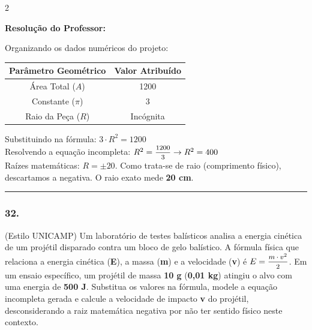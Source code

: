 \begin{multicols*}{2}
\ifgabarito
    \begin{tcolorbox}[colback=CorTitUm!5, colframe=CorTitUm, boxrule=1pt, arc=4pt, left=6pt, right=6pt, top=6pt, bottom=6pt]
    \small\textbf{\textcolor{CorTitUm}{Resolução do Professor:}}\par\vspace{0.1cm}
    \color{CinzaEscuro}
    Organizando os dados numéricos do projeto:
    \vspace{0.1cm}
    \begin{center}
    \begin{tabular}{|c|c|}
    \hline
    \textbf{Parâmetro Geométrico} & \textbf{Valor Atribuído} \\
    \hline
    Área Total ($A$) & 1200 \\
    \hline
    Constante ($\pi$) & 3 \\
    \hline
    Raio da Peça ($R$) & Incógnita \\
    \hline
    \end{tabular}
    \end{center}
    \vspace{0.1cm}
    Substituindo na fórmula: $3 \cdot R^2 = 1200$\\
    Resolvendo a equação incompleta: $R^2 = \mfrac{1200}{3} \rightarrow R^2 = 400$\\
    Raízes matemáticas: $R = \pm 20$. Como trata-se de raio (comprimento físico), descartamos a negativa. O raio exato mede \textbf{20 cm}.
    \end{tcolorbox}
\fi

\par\vspace{\espacoQuestao}

\noindent\textcolor{CorLinha}{\rule{\linewidth}{0.5pt}} 
\par\vspace{\espacoPreQuestao}
\subsubsection*{32.} (Estilo UNICAMP) Um laboratório de testes balísticos analisa a energia cinética de um projétil disparado contra um bloco de gelo balístico. A fórmula física que relaciona a energia cinética (\textbf{E}), a massa (\textbf{m}) e a velocidade (\textbf{v}) é $ E = \mfrac{m \cdot v^2}{2} $. Em um ensaio específico, um projétil de massa \textbf{10 g} (\textbf{0,01 kg}) atingiu o alvo com uma energia de \textbf{500 J}. Substitua os valores na fórmula, modele a equação incompleta gerada e calcule a velocidade de impacto \textbf{v} do projétil, desconsiderando a raiz matemática negativa por não ter sentido físico neste contexto.


\end{multicols*}
